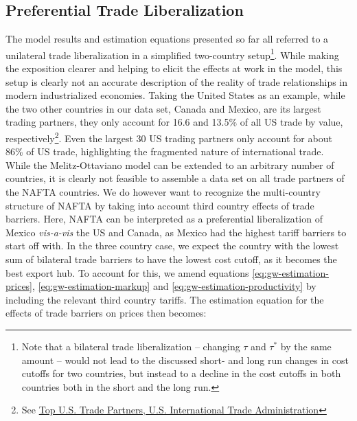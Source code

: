 \subsection{Preferential Trade Liberalization}
The model results and estimation equations presented so far all referred to a 
unilateral trade liberalization in a simplified two-country setup\footnote{Note
 that a bilateral trade liberalization -- changing $\tau$ and
 $\tau^*$ by the same amount -- would not lead to the discussed short- and long 
run changes in cost cutoffs for two countries, but instead to a decline in the cost cutoffs in both countries both in the short and the 
long run.}. While making the exposition clearer and helping to elicit the effects at work in the model, this setup is clearly not an accurate description of the reality of trade relationships in modern industrialized economies. Taking the United States as an example, while the two other countries in our data set, Canada and Mexico, are its largest 
trading partners, they only account for 16.6 and 13.5\% of all US trade by value, 
respectively\footnote{See \href{http://goo.gl/2C0saQ}{Top U.S. Trade Partners, U.S. International Trade Administration}}. 
Even the largest 30 US trading partners only account for about 86\% of US trade, highlighting the fragmented nature of international trade. While the Melitz-Ottaviano model can be extended to an arbitrary number of countries, it is clearly not feasible to assemble a data set on all trade partners of the NAFTA countries. We do however want to recognize the multi-country structure of NAFTA by taking into account third country effects of trade barriers. Here, NAFTA can be interpreted as a preferential liberalization of Mexico \textit{vis-a-vis} the US and Canada, as Mexico had the highest tariff barriers to start off with. In the three country case, we expect the country with the lowest sum of bilateral trade barriers to have the lowest cost cutoff, as it becomes the best export hub. To account for this, we amend equations \ref{eq:gw-estimation-prices}, \ref{eq:gw-estimation-markup} and \ref{eq:gw-estimation-productivity} by including the relevant third country tariffs. The estimation equation for the effects of trade barriers on prices then becomes:

